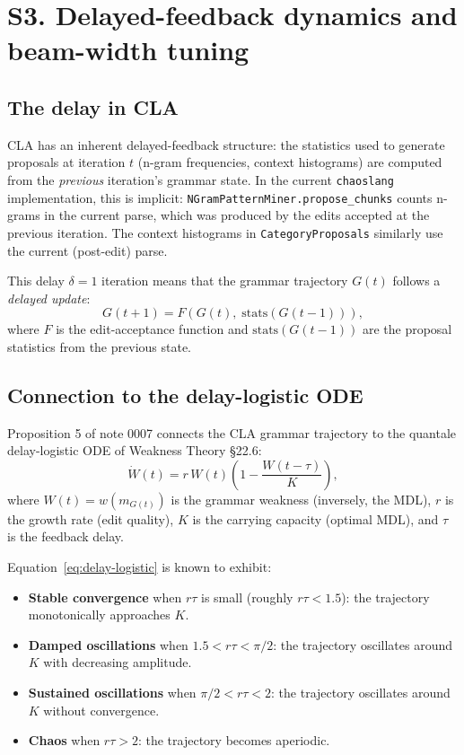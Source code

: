 \documentclass[11pt]{article}
\begin{document}
\section{S3. Delayed-feedback dynamics and beam-width tuning}

\subsection{The delay in CLA}

CLA has an inherent delayed-feedback structure: the statistics used to generate proposals at iteration $t$ (n-gram frequencies, context histograms) are computed from the \emph{previous} iteration's grammar state.  In the current \texttt{chaoslang} implementation, this is implicit: \texttt{NGramPatternMiner.propose\_chunks} counts n-grams in the current parse, which was produced by the edits accepted at the previous iteration.  The context histograms in \texttt{CategoryProposals} similarly use the current (post-edit) parse.

This delay $\delta = 1$ iteration means that the grammar trajectory $G(t)$ follows a \emph{delayed update}:
\begin{equation}
  G(t+1) = F(G(t),\; \text{stats}(G(t-1))),
  \end{equation}
where $F$ is the edit-acceptance function and $\text{stats}(G(t-1))$ are the proposal statistics from the previous state.

\subsection{Connection to the delay-logistic ODE}

Proposition 5 of note 0007 connects the CLA grammar trajectory to the quantale delay-logistic ODE of Weakness Theory \S 22.6:
\begin{equation}
  \dot{W}(t) = r \, W(t) \left(1 - \frac{W(t - \tau)}{K}\right),
  \label{eq:delay-logistic}
\end{equation}
where $W(t) = w(m_{G(t)})$ is the grammar weakness (inversely, the MDL), $r$ is the growth rate (edit quality), $K$ is the carrying capacity (optimal MDL), and $\tau$ is the feedback delay.

Equation~\eqref{eq:delay-logistic} is known to exhibit:
\begin{itemize}
  \item \textbf{Stable convergence} when $r \tau$ is small (roughly $r \tau < 1.5$): the trajectory monotonically approaches $K$.
  \item \textbf{Damped oscillations} when $1.5 < r \tau < \pi/2$: the trajectory oscillates around $K$ with decreasing amplitude.
  \item \textbf{Sustained oscillations} when $\pi/2 < r \tau < 2$: the trajectory oscillates around $K$ without convergence.
  \item \textbf{Chaos} when $r \tau > 2$: the trajectory becomes aperiodic.
\end{itemize}
\end{document}
